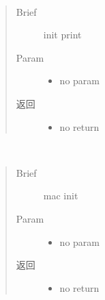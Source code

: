 \documentclass[letterpaper,10pt,english]{sphinxhowto}
\begin{document}
\begin{fulllineitems}

\begin{fulllineitems}
\label{\detokenize{rfapi/index:wifi_api.WIFIAPI.init_print}}~\begin{quote}\begin{description}
\item[{Brief}] \leavevmode
init print

\item[{Param}] \leavevmode\begin{itemize}
\item {} 
no param

\end{itemize}

\item[{返回}] \leavevmode
\begin{itemize}
\item {} 
no return

\end{itemize}


\end{description}\end{quote}

\end{fulllineitems}


\begin{fulllineitems}
\label{\detokenize{rfapi/index:wifi_api.WIFIAPI.macinit}}~\begin{quote}\begin{description}
\item[{Brief}] \leavevmode
mac init

\item[{Param}] \leavevmode\begin{itemize}
\item {} 
no param

\end{itemize}

\item[{返回}] \leavevmode
\begin{itemize}
\item {} 
no return

\end{itemize}


\end{description}\end{quote}


\end{fulllineitems}
\end{fulllineitems}
\end{document}
